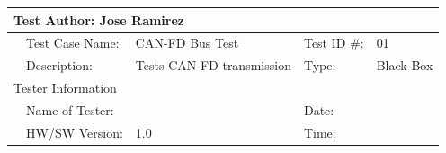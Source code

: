 \begin{table}[]
	\begin{tabular}{|llllllllll|}
		\hline
		\multicolumn{10}{|l|}{Test Author: Jose Ramirez}                                                                                                                                                                                                                                                                                                                                                                                 \\ \hline
		\multicolumn{1}{|l|}{}                      & \multicolumn{2}{l|}{Test Case Name:} & \multicolumn{3}{l|}{CAN-FD Bus Test}                                    & \multicolumn{3}{l|}{Test ID \#:}                                                                                                                                                                                                      & 01                        \\ \hline
		\multicolumn{1}{|l|}{}                      & \multicolumn{2}{l|}{Description:}    & \multicolumn{3}{l|}{Tests CAN-FD transmission}                          & \multicolumn{3}{l|}{Type:}                                                                                                                                                                                                            & Black Box                 \\ \hline
		\multicolumn{10}{|l|}{Tester Information}                                                                                                                                                                                                                                                                                                                                                                                        \\ \hline
		\multicolumn{1}{|l|}{}                      & \multicolumn{2}{l|}{Name of Tester:} & \multicolumn{3}{l|}{}                                                   & \multicolumn{3}{l|}{Date:}                                                                                                                                                                                                            &                           \\ \hline
		\multicolumn{1}{|l|}{}                      & \multicolumn{2}{l|}{HW/SW Version:}  & \multicolumn{3}{l|}{1.0}                                                & \multicolumn{3}{l|}{Time:}                                                                                                                                                                                                            &                           \\ \hline

\end{tabular}
\end{table}
